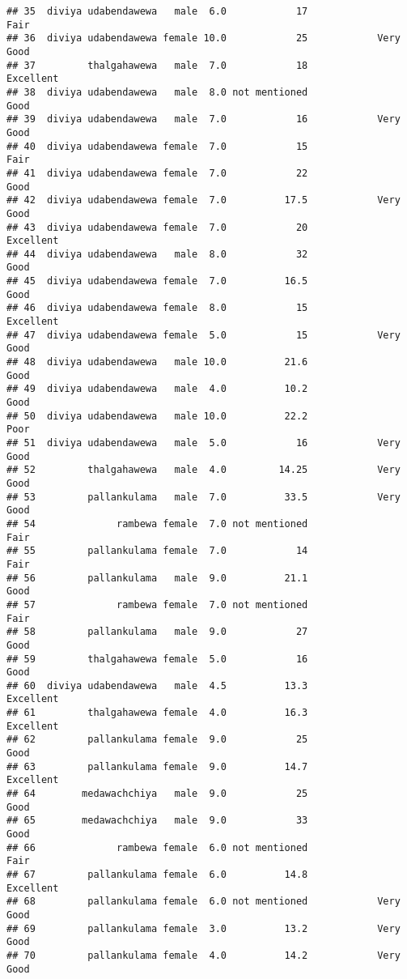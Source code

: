 \documentclass[
]{article}
\begin{document}
\begin{verbatim}
## 35  diviya udabendawewa   male  6.0            17                 Fair
## 36  diviya udabendawewa female 10.0            25            Very Good
## 37         thalgahawewa   male  7.0            18            Excellent
## 38  diviya udabendawewa   male  8.0 not mentioned                 Good
## 39  diviya udabendawewa   male  7.0            16            Very Good
## 40  diviya udabendawewa female  7.0            15                 Fair
## 41  diviya udabendawewa female  7.0            22                 Good
## 42  diviya udabendawewa female  7.0          17.5            Very Good
## 43  diviya udabendawewa female  7.0            20            Excellent
## 44  diviya udabendawewa   male  8.0            32                 Good
## 45  diviya udabendawewa female  7.0          16.5                 Good
## 46  diviya udabendawewa female  8.0            15            Excellent
## 47  diviya udabendawewa female  5.0            15            Very Good
## 48  diviya udabendawewa   male 10.0          21.6                 Good
## 49  diviya udabendawewa   male  4.0          10.2                 Good
## 50  diviya udabendawewa   male 10.0          22.2                 Poor
## 51  diviya udabendawewa   male  5.0            16            Very Good
## 52         thalgahawewa   male  4.0         14.25            Very Good
## 53         pallankulama   male  7.0          33.5            Very Good
## 54              rambewa female  7.0 not mentioned                 Fair
## 55         pallankulama female  7.0            14                 Fair
## 56         pallankulama   male  9.0          21.1                 Good
## 57              rambewa female  7.0 not mentioned                 Fair
## 58         pallankulama   male  9.0            27                 Good
## 59         thalgahawewa female  5.0            16                 Good
## 60  diviya udabendawewa   male  4.5          13.3            Excellent
## 61         thalgahawewa female  4.0          16.3            Excellent
## 62         pallankulama female  9.0            25                 Good
## 63         pallankulama female  9.0          14.7            Excellent
## 64        medawachchiya   male  9.0            25                 Good
## 65        medawachchiya   male  9.0            33                 Good
## 66              rambewa female  6.0 not mentioned                 Fair
## 67         pallankulama female  6.0          14.8            Excellent
## 68         pallankulama female  6.0 not mentioned            Very Good
## 69         pallankulama female  3.0          13.2            Very Good
## 70         pallankulama female  4.0          14.2            Very Good

\end{verbatim}
\end{document}
